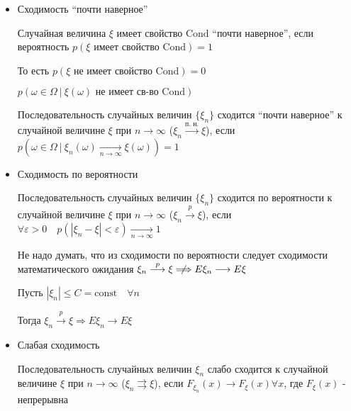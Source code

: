 \documentclass[12pt]{article}
\begin{document}
    \begin{itemize}
        \item Сходимость \enquote{почти наверное}

        \Defs Случайная величина $\xi$ имеет свойство $\mathrm{Cond}$ \enquote{почти наверное}, если вероятность $p(\xi \text{ имеет свойство } \mathrm{Cond}) = 1$
    
        \Nota То есть $p(\xi \text{ не имеет свойство } \mathrm{Cond}) = 0$

        $p(\omega \in \Omega \ | \ \xi(\omega) \text{ не имеет св-во } \mathrm{Cond})$

        \Def Последовательность случайных величин $\{\xi_n\}$ сходится \enquote{почти наверное} к случайной величине $\xi$ при $n \to \infty$ ($\xi_n \overset{\text{п. н.}}{\longrightarrow} \xi$), 
        если $p(\omega \in \Omega \ | \ \xi_n(\omega) \underset{n \to \infty}{\longrightarrow} \xi(\omega)) = 1$

        \item Сходимость по вероятности

        \Defs Последовательность случайных величин $\{\xi_n\}$ сходится по вероятности к случайной величине $\xi$ при $n \to \infty$
        ($\xi_n \overset{p}{\longrightarrow} \xi$), если $\forall \varepsilon > 0 \quad p(|\xi_n - \xi| < \varepsilon) \underset{n \to \infty}{\longrightarrow} 1$
        
        \Nota Не надо думать, что из сходимости по вероятности следует сходимости математического ожидания $\xi_n \overset{p}{\longrightarrow} \xi \centernot{\Longrightarrow} E\xi_n \longrightarrow E\xi$

        \begin{MyTheorem}
            \Ths Пусть $|\xi_n| \leq C = \mathrm{const} \quad \forall n$

            Тогда $\xi_n \overset{p}{\longrightarrow} \xi \Longrightarrow E\xi_n \longrightarrow E\xi$
        \end{MyTheorem}

        \item Слабая сходимость

        \Defs Последовательность случайных величин $\xi_n$ слабо сходится к случайной величине $\xi$ при $n \to \infty$
        ($\xi_n \rightrightarrows \xi$), если $F_{\xi_n}(x) \longrightarrow F_\xi(x) \forall x$, где $F_\xi(x)$ - непрерывна
    
    \end{itemize}

    \hypertarget{connectionbetweenconvergencetypes}{}
\end{document}
